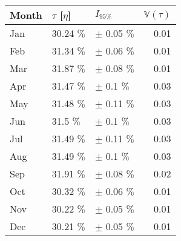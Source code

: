 \begin{tabular}{lllr}
\toprule
Month & $\tau$ [$\eta$] &       $I_{95\%}$ &  $\mathbb{V}(\tau)$ \\
\midrule
  Jan &      30.24 $\%$ &  $\pm$ 0.05 $\%$ &                0.01 \\
  Feb &      31.34 $\%$ &  $\pm$ 0.06 $\%$ &                0.01 \\
  Mar &      31.87 $\%$ &  $\pm$ 0.08 $\%$ &                0.01 \\
  Apr &      31.47 $\%$ &   $\pm$ 0.1 $\%$ &                0.03 \\
  May &      31.48 $\%$ &  $\pm$ 0.11 $\%$ &                0.03 \\
  Jun &       31.5 $\%$ &   $\pm$ 0.1 $\%$ &                0.03 \\
  Jul &      31.49 $\%$ &  $\pm$ 0.11 $\%$ &                0.03 \\
  Aug &      31.49 $\%$ &   $\pm$ 0.1 $\%$ &                0.03 \\
  Sep &      31.91 $\%$ &  $\pm$ 0.08 $\%$ &                0.02 \\
  Oct &      30.32 $\%$ &  $\pm$ 0.06 $\%$ &                0.01 \\
  Nov &      30.22 $\%$ &  $\pm$ 0.05 $\%$ &                0.01 \\
  Dec &      30.21 $\%$ &  $\pm$ 0.05 $\%$ &                0.01 \\
\bottomrule
\end{tabular}
